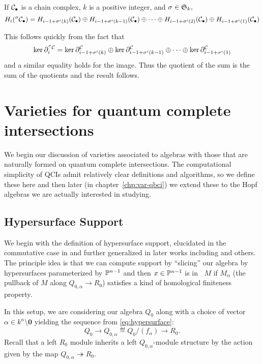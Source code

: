 \documentclass [11pt, proquest] {uwthesis}[2020/02/24]
\DeclareMathOperator{\supph}{supp^\mathit{hyp}}
\begin{document}
    
    
    \begin{prop}\label{prop:homology}
        If $\mathcal{C}_\bullet$ is a chain complex, $k$ is a positive integer, and $\sigma\in\mathfrak{S}_k,$
        \[H_i(^\sigma\mathcal{C}_\bullet)=H_{i-1+\sigma^i(k)}(\mathcal{C}_\bullet)\oplus H_{i-1+\sigma^i(k-1)}(\mathcal{C}_\bullet)\oplus\cdots\oplus H_{i-1+\sigma^i(2)}(\mathcal{C}_\bullet)\oplus H_{i-1+\sigma^i(1)}(\mathcal{C}_\bullet)\]
    \end{prop}
    \begin{prf}
        This follows quickly from the fact that
        \[\ker\partial^{^\sigma\mathcal{C}}_i=\ker\partial^{\mathcal{C}}_{i-1+\sigma^i(k)}\oplus\ker\partial^{\mathcal{C}}_{i-1+\sigma^i(k-1)}\oplus\cdots\oplus \ker\partial^{\mathcal{C}}_{i-1+\sigma^i(1)}\]
        and a similar equality holds for the image. Thus the quotient of the sum is the sum of the quotients and the result follows.
    \end{prf}


\chapter{Varieties for quantum complete intersections}
We begin our discussion of varieties associated to algebras with those that are naturally formed on quantum complete intersections. The computational simplicity of QCIs admit relatively clear definitions and algorithms, so we define these here and then later (in chapter~\ref{chp:var-qbci}) we extend these to the Hopf algebras we are actually interested in studying.

\section{Hypersurface Support}
    We begin with the definition of hypersurface support, elucidated in the commutative case in \cite{avramov-iyengar} and further generalized in later works including \cite{negron-pevtsovaI} and others. The principle idea is that we can compute support by ``slicing'' our algebra by hypersurfaces parameterized by $\mathbb{P}^{n-1}$ and then $x\in\mathbb{P}^{n-1}$ is in $\supph M$ if $M_\alpha$ (the pullback of $M$ along $Q_{0,\alpha}\to R_0$) satisfies a kind of homological finiteness property. 
    
    In this setup, we are considering our algebra $Q_0$ along with a choice of vector $\alpha\in k^n\setminus\mathbf{0}$ yielding the sequence from \eqref{eq:hypersurface}:
    \[Q_0\to Q_{0,\alpha}\eqdef Q_0/(f_\alpha)\to R_0.\]
    Recall that a left $R_0$ module inherits a left $Q_{0,\alpha}$-module structure by the action given by the map $Q_{0,\alpha}\twoheadrightarrow R_0.$
    
\end{document}
